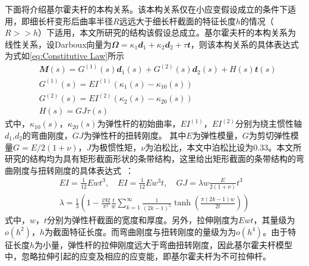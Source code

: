 下面将介绍基尔霍夫杆的本构关系。该本构关系仅在小应变假设成立的条件下适用，即细长杆变形后曲率半径$R$远远大于细长杆截面的特征长度$h$的情况（$R>>h$）下适用，本文所研究的结构该假设总成立。基尔霍夫杆的本构关系为线性关系，设Darboux向量为$\mathbfit{\Omega}=\kappa_1\mathbfit{d}_1+\kappa_2\mathbfit{d}_2+\tau \mathbfit{t}$，则该本构关系的具体表达式为式如\eqref{eq:Constitutive Law}所示
\begin{equation}
	\begin{split}
		&\mathbfit{M}(s)=G^{(1)}(s)\mathbfit{d}_1(s)+G^{(2)}(s)\mathbfit{d}_2(s)+H(s)\mathbfit{t}(s) \\
		 &G^{(1)}(s)=EI^{(1)}(\kappa_1(s)-\kappa_{10}(s))\\ 
		&G^{(2)}(s)=EI^{(2)}(\kappa_2(s)-\kappa_{20}(s))\\
		 &H(s)=G J\tau(s)	
	\end{split}   
	\label{eq:Constitutive Law}
\end{equation}
式中，$\kappa_{10}(s)$，$\kappa_{20}(s)$为弹性杆的初始曲率，$EI^{(1)}$，$EI^{(2)}$分别为绕主惯性轴$d_1$,$d_2$的弯曲刚度，$G J$为弹性杆的扭转刚度。
其中$E$为弹性模量，$G$为剪切弹性模量$G=E/2(1+\nu)$，$J$为极惯性矩，$\nu$为泊松比，本文中泊松比设为$0.33$。本文所研究的结构均为具有矩形截面形状的条带结构，这里给出矩形截面的条带结构的弯曲刚度与扭转刚度的具体表达式~\cite{timoshenko1969theory}：
\begin{equation}
	\begin{gathered}
  EI=\frac{1}{12}Ewt^3,\quad EI=\frac{1}{12}Ew^3t,\quad G J=\lambda w\frac{E}{2(1+\nu)}t^3 \\
  \lambda=\frac{1}{3}\left(1-\frac{192}{\pi^5}\frac{t}{w}\sum_{k=1}^{\infty}\frac{1}{(2k-1)^5}\tanh\left(\frac{\pi(2k-1)w}{2t}\right)\right)
  \end{gathered}
\end{equation}
式中，$w$，$t$分别为弹性杆截面的宽度和厚度。另外，拉伸刚度为$Ewt$，其量级为$o(h^2)$，$h$为截面特征长度。而弯曲刚度与扭转刚度的量级为为$o(h^4)$。由于特征长度$h$为小量，弹性杆的拉伸刚度远大于弯曲扭转刚度，因此基尔霍夫杆模型中，忽略拉伸引起的应变及相应的应变能，即基尔霍夫杆为不可拉伸杆。

